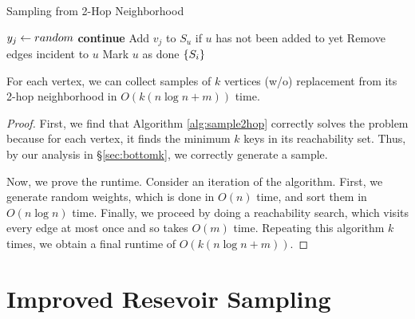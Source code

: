 \documentclass{article}
\begin{document}
\begin{algorithm}
    \caption{Sampling from 2-Hop Neighborhood}
    \begin{algorithmic}[1]
                \State $y_j \gets \mathop{random}$
                        \State \textbf{continue}
                    \EndIf
                        \State Add $v_j$ to $S_u$ if $u$ has not been added to yet
                        \State Remove edges incident to $u$
                        \State Mark $u$ as done
                    \EndFor
                \EndFor
            \EndFor
            \Return $\left\{ S_i \right\}$
        \EndFunction
    \end{algorithmic}
    \label{alg:sample2hop}
\end{algorithm}

\begin{theorem}
    For each vertex, we can collect samples of $k$ vertices (w/o) replacement from its 2-hop neighborhood in $O(k(n \log n + m))$ time.
\end{theorem}

\begin{proof}
    First, we find that Algorithm \ref{alg:sample2hop} correctly solves the problem because for each vertex, it finds the minimum $k$ keys in its reachability set.
    Thus, by our analysis in \S\ref{sec:bottomk}, we correctly generate a sample.

    Now, we prove the runtime.
    Consider an iteration of the algorithm.
    First, we generate random weights, which is done in $O(n)$ time, and sort them in $O(n \log n)$ time.
    Finally, we proceed by doing a reachability search, which visits every edge at most once and so takes $O(m)$ time.
    Repeating this algorithm $k$ times, we obtain a final runtime of $O(k(n \log n + m))$.
\end{proof}

\section{Improved Resevoir Sampling}
\label{sec:resevoir}
\end{document}

